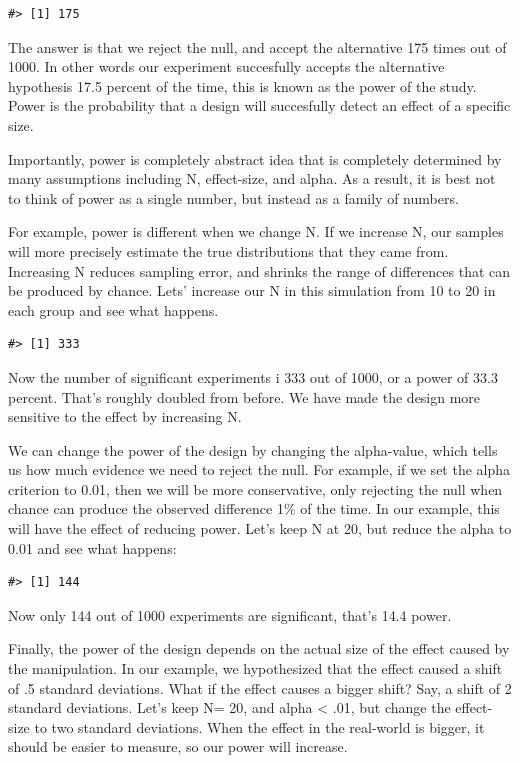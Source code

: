 \documentclass[
  letterpaper,
  DIV=11,
  numbers=noendperiod]{scrreprt}
\begin{document}
\begin{verbatim}
#> [1] 175
\end{verbatim}

The answer is that we reject the null, and accept the alternative 175
times out of 1000. In other words our experiment succesfully accepts the
alternative hypothesis 17.5 percent of the time, this is known as the
power of the study. Power is the probability that a design will
succesfully detect an effect of a specific size.

Importantly, power is completely abstract idea that is completely
determined by many assumptions including N, effect-size, and alpha. As a
result, it is best not to think of power as a single number, but instead
as a family of numbers.

For example, power is different when we change N. If we increase N, our
samples will more precisely estimate the true distributions that they
came from. Increasing N reduces sampling error, and shrinks the range of
differences that can be produced by chance. Lets' increase our N in this
simulation from 10 to 20 in each group and see what happens.

\begin{verbatim}
#> [1] 333
\end{verbatim}

Now the number of significant experiments i 333 out of 1000, or a power
of 33.3 percent. That's roughly doubled from before. We have made the
design more sensitive to the effect by increasing N.

We can change the power of the design by changing the alpha-value, which
tells us how much evidence we need to reject the null. For example, if
we set the alpha criterion to 0.01, then we will be more conservative,
only rejecting the null when chance can produce the observed difference
1\% of the time. In our example, this will have the effect of reducing
power. Let's keep N at 20, but reduce the alpha to 0.01 and see what
happens:

\begin{verbatim}
#> [1] 144
\end{verbatim}

Now only 144 out of 1000 experiments are significant, that's 14.4 power.

Finally, the power of the design depends on the actual size of the
effect caused by the manipulation. In our example, we hypothesized that
the effect caused a shift of .5 standard deviations. What if the effect
causes a bigger shift? Say, a shift of 2 standard deviations. Let's keep
N= 20, and alpha \textless{} .01, but change the effect-size to two
standard deviations. When the effect in the real-world is bigger, it
should be easier to measure, so our power will increase.
\end{document}
